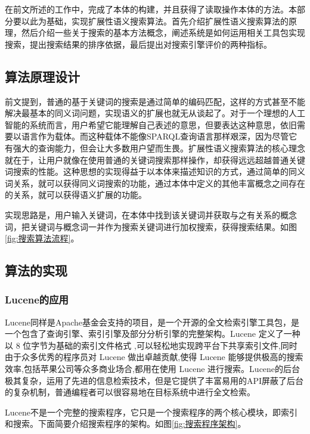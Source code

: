 \documentclass[12pt,a4paper]{article}
\begin{document}
	在前文所述的工作中，完成了本体的构建，并且获得了读取操作本体的方法。本部分要以此为基础，实现扩展性语义搜索算法。首先介绍扩展性语义搜索算法的原理，然后介绍一些关于搜索的基本方法概念，阐述系统是如何运用相关工具包实现搜索，提出搜索结果的排序依据，最后提出对搜索引擎评价的两种指标。
	\subsection{算法原理设计}
	
	前文提到，普通的基于关键词的搜索是通过简单的编码匹配，这样的方式甚至不能解决最基本的同义词问题，实现语义的扩展也就无从谈起了。对于一个理想的人工智能的系统而言，用户希望它能理解自己表述的意思，但要表达这种意思，依旧需要以语言作为载体。而这种载体不能像{\Times SPARQL}查询语言那样艰深，因为尽管它有强大的查询能力，但会让大多数用户望而生畏。扩展性语义搜索算法的核心理念就在于，让用户就像在使用普通的关键词搜索那样操作，却获得远远超越普通关键词搜索的性能。这种思想的实现得益于以本体来描述知识的方式，通过简单的同义词关系，就可以获得同义词搜索的功能，通过本体中定义的其他丰富概念之间存在的关系，就可以获得语义扩展的功能。
	
	实现思路是，用户输入关键词，在本体中找到该关键词并获取与之有关系的概念词，把关键词与概念词一并作为搜索关键词进行加权搜索，获得搜索结果。如图\ref{fig:搜索算法流程}。
	
	\subsection{算法的实现}
		\subsubsection{{\Times Lucene}的应用}
	{\Times Lucene}同样是{\Times Apache}基金会支持的项目，是一个开源的全文检索引擎工具包，是一个包含了查询引擎、索引引擎及部分分析引擎的完整架构。{\Times Lucene }定义了一种以 8 位字节为基础的索引文件格式 ,可以轻松地实现跨平台下共享索引文件,同时由于众多优秀的程序员对 {\Times Lucene }做出卓越贡献,使得 {\Times Lucene }能够提供极高的搜索效率,包括苹果公司等众多商业场合,都用在使用 {\Times Lucene }进行搜索。{\Times Lucene}的后台极其复杂，运用了先进的信息检索技术，但是它提供了丰富易用的API屏蔽了后台的复杂机制，普通编程者可以很容易地在目标系统中进行全文检索。
	
	{\Times Lucene}不是一个完整的搜索程序，它只是一个搜索程序的两个核心模块，即索引和搜索。下面简要介绍搜索程序的架构。如图\ref{fig:搜索程序架构}。
	
\end{document}
